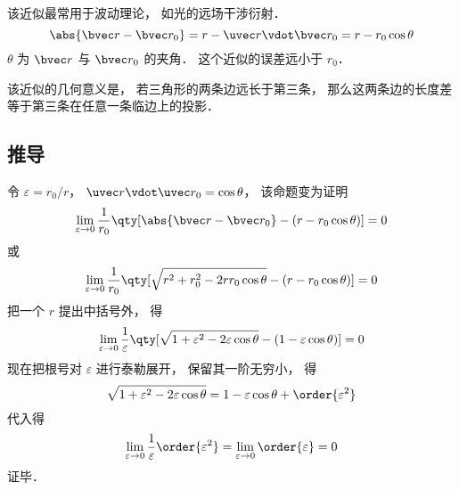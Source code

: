 

该近似最常用于波动理论， 如光的远场干涉衍射．
\begin{equation}
\abs{\bvec r - \bvec r_0} = r - \uvec r \vdot \bvec r_0 = r - r_0 \cos\theta
\end{equation}
$\theta$ 为 $\bvec r$ 与 $\bvec r_0$ 的夹角． 这个近似的误差远小于 $r_0$．

该近似的几何意义是， 若三角形的两条边远长于第三条， 那么这两条边的长度差等于第三条在任意一条临边上的投影． %

\subsection{推导}

令 $\varepsilon = r_0 / r$， $\uvec r \vdot \uvec r_0 = \cos\theta$， 该命题变为证明
\begin{equation}
\lim_{\varepsilon \to 0} \frac{1}{r_0} \qty[\abs{\bvec r - \bvec r_0} - (r - r_0 \cos\theta)] = 0
\end{equation}
或
\begin{equation}
\lim_{\varepsilon \to 0} \frac{1}{r_0} \qty[\sqrt{r^2 + r_0^2 - 2rr_0\cos\theta} - (r - r_0 \cos\theta)] = 0
\end{equation}
把一个 $r$ 提出中括号外， 得
\begin{equation}
\lim_{\varepsilon \to 0} \frac{1}{\varepsilon} \qty[\sqrt{1 + \varepsilon^2 - 2\varepsilon\cos\theta} - (1 - \varepsilon \cos\theta)] = 0
\end{equation}
现在把根号对 $\varepsilon$ 进行泰勒展开， 保留其一阶无穷小， 得
\begin{equation}
\sqrt{1 + \varepsilon^2 - 2\varepsilon\cos\theta} = 1 - \varepsilon \cos\theta + \order{\varepsilon^2}
\end{equation}
代入得
\begin{equation}
\lim_{\varepsilon \to 0} \frac1\varepsilon \order{\varepsilon^2} = \lim_{\varepsilon \to 0} \order{\varepsilon} = 0
\end{equation}
证毕．

